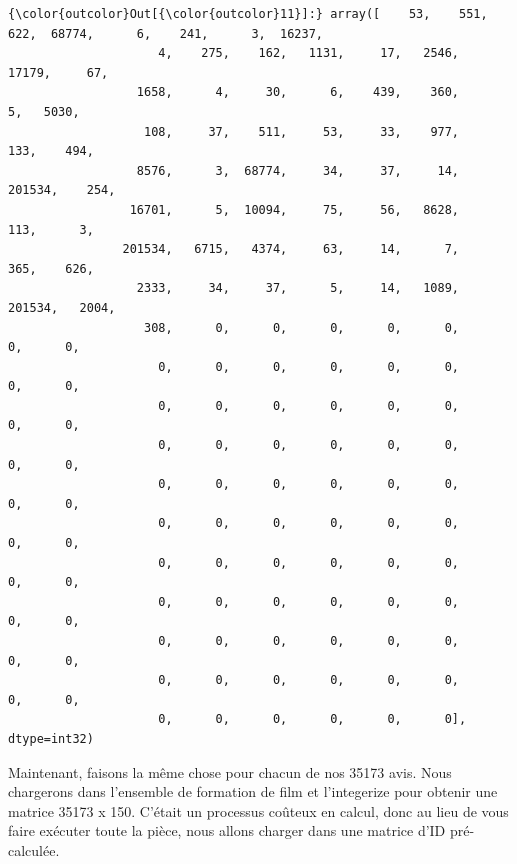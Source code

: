 \documentclass[11pt]{article}
\begin{document}
\begin{Verbatim}[commandchars=\\\{\}]
{\color{outcolor}Out[{\color{outcolor}11}]:} array([    53,    551,    622,  68774,      6,    241,      3,  16237,
                     4,    275,    162,   1131,     17,   2546,  17179,     67,
                  1658,      4,     30,      6,    439,    360,      5,   5030,
                   108,     37,    511,     53,     33,    977,    133,    494,
                  8576,      3,  68774,     34,     37,     14, 201534,    254,
                 16701,      5,  10094,     75,     56,   8628,    113,      3,
                201534,   6715,   4374,     63,     14,      7,    365,    626,
                  2333,     34,     37,      5,     14,   1089, 201534,   2004,
                   308,      0,      0,      0,      0,      0,      0,      0,
                     0,      0,      0,      0,      0,      0,      0,      0,
                     0,      0,      0,      0,      0,      0,      0,      0,
                     0,      0,      0,      0,      0,      0,      0,      0,
                     0,      0,      0,      0,      0,      0,      0,      0,
                     0,      0,      0,      0,      0,      0,      0,      0,
                     0,      0,      0,      0,      0,      0,      0,      0,
                     0,      0,      0,      0,      0,      0,      0,      0,
                     0,      0,      0,      0,      0,      0,      0,      0,
                     0,      0,      0,      0,      0,      0,      0,      0,
                     0,      0,      0,      0,      0,      0], dtype=int32)
\end{Verbatim}
            
    Maintenant, faisons la même chose pour chacun de nos 35173 avis. Nous
chargerons dans l'ensemble de formation de film et l'integerize pour
obtenir une matrice 35173 x 150. C'était un processus coûteux en calcul,
donc au lieu de vous faire exécuter toute la pièce, nous allons charger
dans une matrice d'ID pré-calculée.
\end{document}
